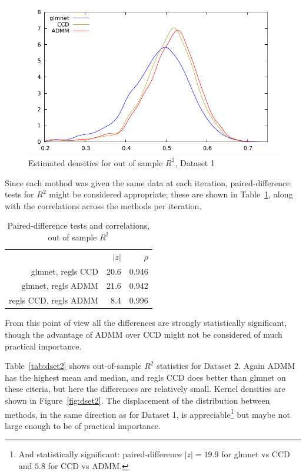 \documentclass{article}
\begin{document}
\begin{figure}[htbp]
  \centering
  \includegraphics[scale=0.9]{murder_kd3.pdf} 
  \caption{Estimated densities for out of sample $R^2$, Dataset 1}
  \label{fig:dset1}
\end{figure}

Since each mothod was given the same data at each iteration,
paired-difference tests for $R^2$ might be considered appropriate;
these are shown in Table~\ref{tab:paired}, along with the correlations
across the methods per iteration.

\begin{table}[htbp]
\begin{center}
  \begin{tabular}{rrr}
    & $|z|$ & $\rho$ \\[4pt]
glmnet, regls CCD & 20.6 & 0.946 \\
glmnet, regls ADMM & 21.6 & 0.942 \\
regls CCD, regls ADMM & 8.4 & 0.996 \\
  \end{tabular}
  \caption{Paired-difference tests and correlations, out of sample $R^2$}
  \label{tab:paired}  
\end{center}
\end{table}

From this point of view all the differences are strongly statistically
significant, though the advantage of ADMM over CCD might not be
considered of much practical importance.


Table~\ref{tab:dset2} shows out-of-sample $R^2$ statistics for Dataset
2. Again ADMM has the highest mean and median, and regls CCD does
better than glmnet on these citeria, but here the differences are
relatively small. Kernel densities are shown in
Figure~\ref{fig:dset2}. The displacement of the distribution between
methods, in the same direction as for Dataset 1, is
appreciable\footnote{And statistically significant: paired-difference
  $|z| = 19.9$ for glmnet vs CCD and $5.8$ for CCD vs ADMM.} but
maybe not large enough to be of practical importance.
\end{document}
